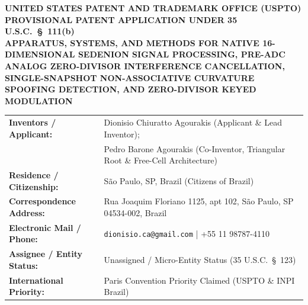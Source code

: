 \documentclass[12pt,letterpaper]{article}
\begin{document}
\begin{center}
    {\large \textbf{UNITED STATES PATENT AND TRADEMARK OFFICE (USPTO)\\PROVISIONAL PATENT APPLICATION UNDER 35 U.S.C.\ \S\ 111(b)}}\\[8pt]
    {\LARGE \textbf{APPARATUS, SYSTEMS, AND METHODS FOR NATIVE 16-DIMENSIONAL SEDENION SIGNAL PROCESSING, PRE-ADC ANALOG ZERO-DIVISOR INTERFERENCE CANCELLATION, SINGLE-SNAPSHOT NON-ASSOCIATIVE CURVATURE SPOOFING DETECTION, AND ZERO-DIVISOR KEYED MODULATION}}\\[10pt]
\end{center}

\begin{tabular}{@{}p{2.2in}p{4.1in}@{}}
\toprule
\textbf{Inventors / Applicant:} & Dionisio Chiuratto Agourakis (Applicant \& Lead Inventor);\\
 & Pedro Barone Agourakis (Co-Inventor, Triangular Root \& Free-Cell Architecture) \\
\textbf{Residence / Citizenship:} & S\~ao Paulo, SP, Brazil (Citizens of Brazil) \\
\textbf{Correspondence Address:} & Rua Joaquim Floriano 1125, apt 102, S\~ao Paulo, SP 04534-002, Brazil \\
\textbf{Electronic Mail / Phone:} & \texttt{dionisio.ca@gmail.com} \quad | \quad +55 11 98787-4110 \\
\textbf{Assignee / Entity Status:} & Unassigned / Micro-Entity Status (35 U.S.C.\ \S\ 123) \\
\textbf{International Priority:} & Paris Convention Priority Claimed (USPTO \& INPI Brazil) \\
\bottomrule
\end{tabular}
\end{document}
